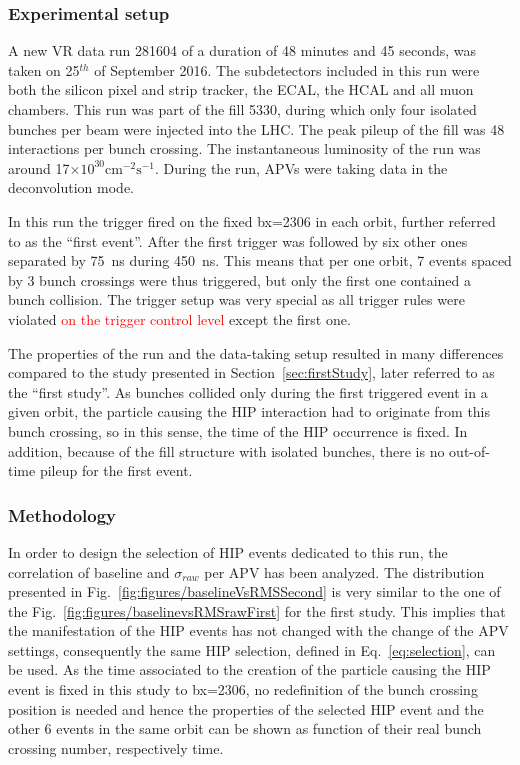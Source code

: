 
\subsubsection{Experimental setup}

A new VR data run 281604 of a duration of 48 minutes and 45 seconds, was taken on 25$^{th}$ of September 2016. The subdetectors included in this run were both the silicon pixel and strip tracker, the ECAL, the HCAL and all muon chambers. This run was part of the fill 5330, during which only four isolated bunches per beam were injected into the LHC. The peak pileup of the fill was 48 interactions per bunch crossing. The instantaneous luminosity of the run was around 17$\times 10^{30} \mathrm{cm^{-2} s^{-1}}$. During the run, APVs were taking data in the deconvolution mode. 

In this run the trigger fired on the fixed bx=2306 in each orbit, further referred to as the ``first event''. After the first trigger was followed by six other ones separated by 75~ns during 450~ns. This means that per one orbit, 7 events spaced by 3 bunch crossings were thus triggered, but only the first one contained a bunch collision. The trigger setup was very special as all trigger rules were violated \textcolor{red}{on the trigger control level} except the first one.


The properties of the run and  the data-taking setup resulted in many differences compared to the study presented in Section~\ref{sec:firstStudy}, later referred to as the ``first study''. As bunches collided only during the first triggered event in a given orbit, the particle causing the HIP interaction had to originate from this bunch crossing, so in this sense, the time of the HIP occurrence is fixed. In addition, because of the fill structure with isolated bunches, there is no out-of-time pileup for the first event.

\subsubsection{Methodology}

In order to design the selection of HIP events dedicated to this run, the correlation of baseline and $\sigma_{raw}$ per APV has been analyzed. The distribution presented in Fig.~\ref{fig:figures/baselineVsRMSSecond} is very similar to the one of the Fig.~\ref{fig:figures/baselinevsRMSrawFirst} for the first study. This implies that the manifestation of the HIP events has not changed with the change of the APV settings, consequently the same HIP selection, defined in Eq.~\ref{eq:selection}, can be used. As the time associated to the creation of the particle causing the HIP event is fixed in this study to bx=2306, no redefinition of the bunch crossing position is needed and hence the properties of the selected HIP event and the other 6 events in the same orbit can be shown as function of their real bunch crossing number, respectively time.

